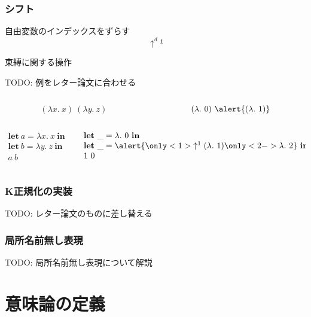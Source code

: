 \documentclass[dvipdfmx,cjk,xcolor=dvipsnames,envcountsect,notheorems,12pt]{beamer}
\theoremstyle{definition}
\newcommand{\keyword}[1]{\mathbf{#1}}
\newcommand{\LET}{\keyword{let}}
\newcommand{\IN}{\keyword{in}}
\begin{document}
\begin{frame}
	\frametitle{シフト}
	\LARGE 自由変数のインデックスをずらす
	\[\uparrow^d t \]

	束縛に関する操作

	TODO: 例をレター論文に合わせる

	{\large \begin{columns}
		\begin{column}{0.5\textwidth}
			\[ (\lambda x.~x)~(\lambda y.~z) \]
		\end{column}
		\begin{column}{0.5\textwidth}
			\[ (\lambda.~0)~\alert{(\lambda.~1)} \]
		\end{column}
	\end{columns}

	\vfill

	\begin{columns}
		\begin{column}{0.5\textwidth}
			\[ 
					\begin{array}{l}
						\LET~a = \lambda x.~x~\IN \\
						\LET~b = \lambda y.~z~\IN \\
						a~b
					\end{array}
			\]
		\end{column}
		\begin{column}{0.5\textwidth}
			\[
				\begin{array}{l}
					\LET~\_ = \lambda.~0~\IN \\
					\LET~\_ = \alert{\only<1>{\uparrow^1(\lambda.~1)}\only<2->{\lambda.~2}}~\IN \\
					1~0
				\end{array}
			\]
		\end{column}
	\end{columns}}
	\pause
\end{frame}

\begin{frame}[fragile]
	\frametitle{K正規化の実装}
	TODO: レター論文のものに差し替える
\end{frame}

\begin{frame}
	\frametitle{局所名前無し表現}
	TODO: 局所名前無し表現について解説
\end{frame}

\section{意味論の定義}
\end{document}
